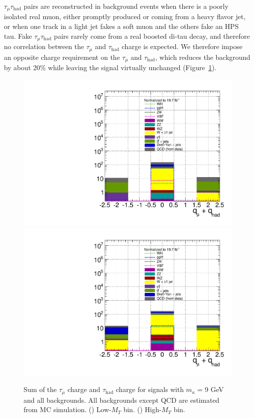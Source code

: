 $\tau_{\mu}\tau_{\text{had}}$ pairs are reconstructed in background events when there is a poorly isolated real muon, either promptly produced or coming from a heavy flavor jet, or when one track in a light jet fakes a soft muon and the others fake an HPS tau.  Fake $\tau_{\mu}\tau_{\text{had}}$ pairs rarely come from a real boosted di-tau decay, and therefore no correlation between the $\tau_{\mu}$ and $\tau_{\text{had}}$ charge is expected.  We therefore impose an opposite charge requirement on the $\tau_{\mu}$ and $\tau_{\text{had}}$, which reduces the background by about 20\% while leaving the signal virtually unchanged (Figure~\ref{fig:muHadMass_SSSF}).

\begin{figure}[hbtp]
  \begin{center}
    \includegraphics[width=1.2\cmsFigWidth]{figures/muHadCharge_lowMT_beforeSSSF}
    \includegraphics[width=1.2\cmsFigWidth]{figures/muHadCharge_highMT_beforeSSSF}
    \caption{Sum of the $\tau_{\mu}$ charge and $\tau_{\text{had}}$ charge for signals with $m_a$ = 9 GeV and all backgrounds.  All backgrounds except QCD are estimated from MC simulation. (\cmsLeft) Low-$M_{T}$ bin. (\cmsRight) High-$M_{T}$ bin. }
    \label{fig:muHadMass_SSSF}
  \end{center}
\end{figure}

